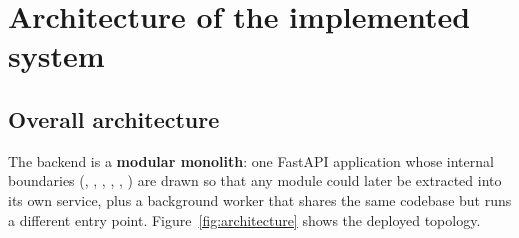 \section{Architecture of the implemented system}

\subsection{Overall architecture}

The backend is a \textbf{modular monolith}: one FastAPI application whose
internal boundaries (, , ,
, , ) are drawn so that any module could
later be extracted into its own service, plus a background worker that shares
the same codebase but runs a different entry point.
Figure~\ref{fig:architecture} shows the deployed topology.

